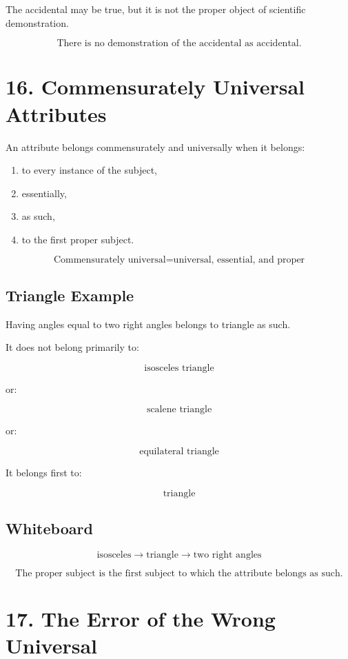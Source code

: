 \documentclass[12pt]{article}
\begin{document}
The accidental may be true, but it is not the proper object of scientific
demonstration.

\[
\boxed{
\text{There is no demonstration of the accidental as accidental.}
}
\]

\section*{16. Commensurately Universal Attributes}

An attribute belongs commensurately and universally when it belongs:

\begin{enumerate}[itemsep=0.25em]
    \item to every instance of the subject,
    \item essentially,
    \item as such,
    \item to the first proper subject.
\end{enumerate}

\[
\boxed{
\text{Commensurately universal} =
\text{universal, essential, and proper}
}
\]

\subsection*{Triangle Example}

Having angles equal to two right angles belongs to triangle as such.

It does not belong primarily to:

\[
\text{isosceles triangle}
\]

or:

\[
\text{scalene triangle}
\]

or:

\[
\text{equilateral triangle}
\]

It belongs first to:

\[
\text{triangle}
\]

\subsection*{Whiteboard}

\[
\text{isosceles} \rightarrow \text{triangle} \rightarrow \text{two right angles}
\]

\[
\boxed{
\text{The proper subject is the first subject to which the attribute belongs as such.}
}
\]

\section*{17. The Error of the Wrong Universal}
\end{document}
